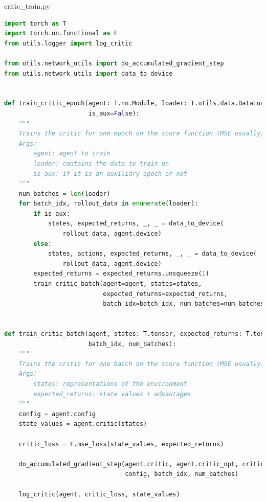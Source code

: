 \documentclass{article}
\begin{document}
\newpage
critic\_train.py
\begin{lstlisting}[language=Python]
import torch as T
import torch.nn.functional as F
from utils.logger import log_critic

from utils.network_utils import do_accumulated_gradient_step
from utils.network_utils import data_to_device


def train_critic_epoch(agent: T.nn.Module, loader: T.utils.data.DataLoader,
                       is_aux=False):
    """
    Trains the critic for one epoch on the score function (MSE usually)
    Args:
        agent: agent to train
        loader: contains the data to train on
        is_aux: if it is an auxiliary epoch or not
    """
    num_batches = len(loader)
    for batch_idx, rollout_data in enumerate(loader):
        if is_aux:
            states, expected_returns, _, _ = data_to_device(
                rollout_data, agent.device)
        else:
            states, actions, expected_returns, _, _ = data_to_device(
                rollout_data, agent.device)
        expected_returns = expected_returns.unsqueeze(1)
        train_critic_batch(agent=agent, states=states,
                           expected_returns=expected_returns,
                           batch_idx=batch_idx, num_batches=num_batches)


def train_critic_batch(agent, states: T.tensor, expected_returns: T.tensor,
                       batch_idx, num_batches):
    """
    Trains the critic for one batch on the score function (MSE usually)
    Args:
        states: representations of the environment
        expected_returns: state values + advantages
    """
    config = agent.config
    state_values = agent.critic(states)

    critic_loss = F.mse_loss(state_values, expected_returns)

    do_accumulated_gradient_step(agent.critic, agent.critic_opt, critic_loss,
                                 config, batch_idx, num_batches)

    log_critic(agent, critic_loss, state_values)
\end{lstlisting}
\newpage
\end{document}
